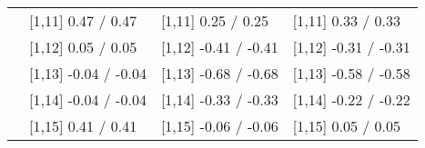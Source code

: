 \begin{table}
\begin{tabular}[t]{llll}
 & {}[1,11] 0.47  / 0.47 & {}[1,11] 0.25  / 0.25 & {}[1,11] 0.33  / 0.33\\
 & {}[1,12] 0.05  / 0.05 & {}[1,12] -0.41  / -0.41 & {}[1,12] -0.31  / -0.31\\
\addlinespace
 & {}[1,13] -0.04  / -0.04 & {}[1,13] -0.68  / -0.68 & {}[1,13] -0.58  / -0.58\\
 & {}[1,14] -0.04  / -0.04 & {}[1,14] -0.33  / -0.33 & {}[1,14] -0.22  / -0.22\\
 & {}[1,15] 0.41  / 0.41 & {}[1,15] -0.06  / -0.06 & {}[1,15] 0.05  / 0.05\\
\bottomrule
\end{tabular}
\end{table}
